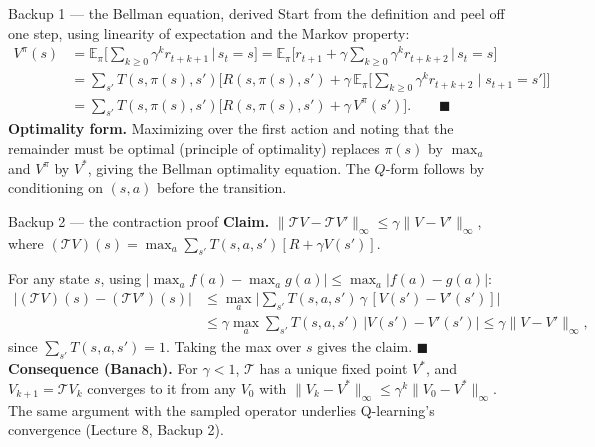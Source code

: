 \documentclass[10pt, aspectratio=169]{beamer}
\begin{document}
\appendix

\begin{frame}{Backup 1 --- the Bellman equation, derived}
\footnotesize
Start from the definition and peel off one step, using linearity of expectation and the Markov property:
\begin{align*}
V^\pi(s) &= \mathbb{E}_\pi\Big[\textstyle\sum_{k\ge0}\gamma^k r_{t+k+1}\,\Big|\, s_t=s\Big]
= \mathbb{E}_\pi\Big[r_{t+1} + \gamma\textstyle\sum_{k\ge0}\gamma^k r_{t+k+2}\,\Big|\, s_t=s\Big]\\
&= \sum_{s'} T(s,\pi(s),s')\Big[R(s,\pi(s),s') + \gamma\,\mathbb{E}_\pi\big[\textstyle\sum_{k\ge0}\gamma^k r_{t+k+2}\mid s_{t+1}=s'\big]\Big]\\
&= \sum_{s'} T(s,\pi(s),s')\Big[R(s,\pi(s),s') + \gamma\, V^\pi(s')\Big]. \qquad\blacksquare
\end{align*}
\medskip
\textbf{Optimality form.} Maximizing over the first action and noting that the remainder must be optimal (principle of optimality) replaces $\pi(s)$ by $\max_a$ and $V^\pi$ by $V^*$, giving the Bellman optimality equation. The $Q$-form follows by conditioning on $(s,a)$ before the transition.
\end{frame}

\begin{frame}{Backup 2 --- the contraction proof}
\footnotesize
\textbf{Claim.} $\|\mathcal{T}V - \mathcal{T}V'\|_\infty \le \gamma\|V-V'\|_\infty$, where $(\mathcal{T}V)(s)=\max_a\sum_{s'}T(s,a,s')[R+\gamma V(s')]$.
\medskip

For any state $s$, using $|\max_a f(a) - \max_a g(a)| \le \max_a |f(a)-g(a)|$:
\begin{align*}
|(\mathcal{T}V)(s) - (\mathcal{T}V')(s)|
&\le \max_a \Big|\sum_{s'} T(s,a,s')\,\gamma\,[V(s') - V'(s')]\Big|\\
&\le \gamma \max_a \sum_{s'} T(s,a,s')\,|V(s')-V'(s')|
\le \gamma \|V - V'\|_\infty,
\end{align*}
since $\sum_{s'}T(s,a,s')=1$. Taking the max over $s$ gives the claim. \hfill$\blacksquare$
\medskip
\textbf{Consequence (Banach).} For $\gamma<1$, $\mathcal{T}$ has a unique fixed point $V^*$, and $V_{k+1}=\mathcal{T}V_k$ converges to it from any $V_0$ with $\|V_k - V^*\|_\infty \le \gamma^k\|V_0 - V^*\|_\infty$. The same argument with the sampled operator underlies Q-learning's convergence (Lecture 8, Backup 2).
\end{frame}
\end{document}
